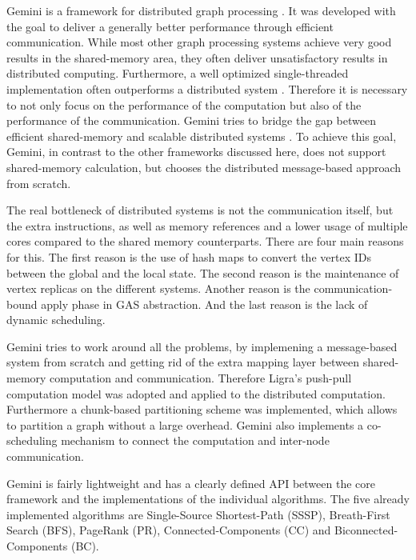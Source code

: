 
Gemini is a framework for distributed graph processing \cite{Gemini}.
It was developed with the goal to deliver a generally better performance through efficient communication.
While most other graph processing systems achieve very good results in the shared-memory area, they often deliver unsatisfactory results in distributed computing.
Furthermore, a well optimized single-threaded implementation often outperforms a distributed system \cite{scalability}.
Therefore it is necessary to not only focus on the performance of the computation but also of the performance of the communication.
Gemini tries to bridge the gap between efficient shared-memory and scalable distributed systems \cite{Gemini}.
To achieve this goal, Gemini, in contrast to the other frameworks discussed here, does not support shared-memory calculation, but chooses the distributed message-based approach from scratch.

The real bottleneck of distributed systems is not the communication itself, but the extra instructions, as well as memory references and a lower usage of multiple cores compared to the shared memory counterparts.
There are four main reasons for this.
The first reason is the use of hash maps to convert the vertex IDs between the global and the local state.
The second reason is the maintenance of vertex replicas on the different systems.
Another reason is the communication-bound apply phase in GAS abstraction.
And the last reason is the lack of dynamic scheduling.

Gemini tries to work around all the problems, by implemening a message-based system from scratch and getting rid of the extra mapping layer between shared-memory computation and communication.
Therefore Ligra's push-pull computation model was adopted and applied to the distributed computation.
Furthermore a chunk-based partitioning scheme was implemented, which allows to partition a graph without a large overhead.
Gemini also implements a co-scheduling mechanism to connect the computation and inter-node communication.

Gemini is fairly lightweight and has a clearly defined API between the core framework and the implementations of the individual algorithms. The five already implemented algorithms are Single-Source Shortest-Path (SSSP), Breath-First Search (BFS), PageRank (PR), Connected-Components (CC) and Biconnected-Components (BC).

